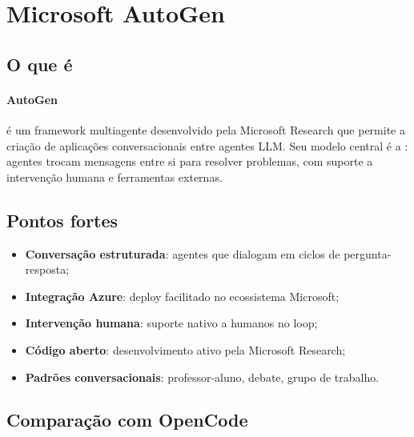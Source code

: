 \section{Microsoft AutoGen}
\label{sec:autogen}
\nivelintermediario

\subsection{O que é}

\paragraph{AutoGen} é um framework multiagente desenvolvido pela Microsoft
Research que permite a criação de aplicações conversacionais entre agentes
LLM. Seu modelo central é a : agentes trocam
mensagens entre si para resolver problemas, com suporte a intervenção
humana e ferramentas externas.

\subsection{Pontos fortes}

\begin{itemize}
    \item \textbf{Conversação estruturada}: agentes que dialogam em
          ciclos de pergunta-resposta;
    \item \textbf{Integração Azure}: deploy facilitado no ecossistema
          Microsoft;
    \item \textbf{Intervenção humana}: suporte nativo a humanos no loop;
    \item \textbf{Código aberto}: desenvolvimento ativo pela Microsoft
          Research;
    \item \textbf{Padrões conversacionais}: professor-aluno,
          debate, grupo de trabalho.
\end{itemize}

\subsection{Comparação com OpenCode}

